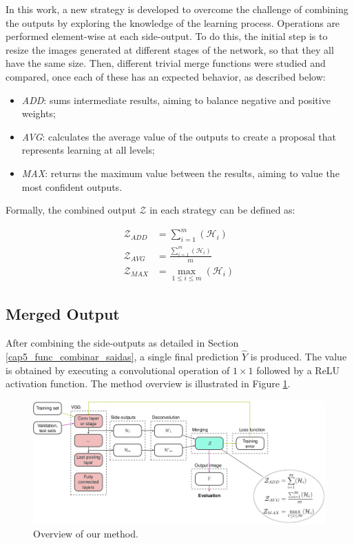 In this work, a new strategy is developed to overcome the challenge of combining the outputs by exploring the knowledge of the learning process.
Operations are performed element-wise at each side-output.
To do this, the initial step is to resize the images generated at different stages of the network, so that they all have the same size.
Then, different trivial merge functions were studied and compared, once each of these has an expected behavior, as described below:

\begin{itemize}
  \item \textit{ADD}: sums intermediate results, aiming to balance negative and positive weights;
  \item \textit{AVG}: calculates the average value of the outputs to create a proposal that represents learning at all levels;
  \item \textit{MAX}: returns the maximum value between the results, aiming to value the most confident outputs.
\end{itemize}

Formally, the combined output $\mathcal{Z}$ in each strategy can be defined as:

\begin{align}
  \mathcal{Z}_{ADD} &= \sum_{i=1}^{m}(\mathcal{H}_i)\\
  \mathcal{Z}_{AVG} &= \frac{\sum_{i=1}^{m}(\mathcal{H}_i)}{m}\\
  \mathcal{Z}_{MAX} &= \max_{1 \leq i \leq m} (\mathcal{H}_i)
\end{align} 

\subsection{Merged Output}
\label{cap5_saida_final_rede}

After combining the side-outputs as detailed in Section \ref{cap5_func_combinar_saidas}, a single final prediction $\hat{Y}$ is produced.
The value is obtained by executing a convolutional operation of $1 \times 1$ followed by a ReLU activation function.
The method overview is illustrated in Figure \ref{fig:method}.

\begin{figure}
  \centering
  \includegraphics[width=1\textwidth]{../imagens/ilustracoes/cap5_metodo.png} %
  \caption{Overview of our method.}
  \label{fig:method}
\end{figure}

